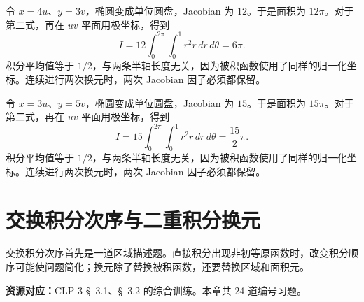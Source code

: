 \documentclass[UTF8,12pt,a4paper,fontset=fandol]{ctexart}
\begin{document}
\begin{solve}\label{ans:c36q24}
令 $x=4u$、$y=3v$，椭圆变成单位圆盘，Jacobian 为 $12$。于是面积为 $12\pi$。对于第二式，再在 $uv$ 平面用极坐标，得到
\[
I=12\int_0^{2\pi}\int_0^1r^2r\,dr\,d\theta=6\pi.
\]
积分平均值等于 $1/2$，与两条半轴长度无关，因为被积函数使用了同样的归一化坐标。连续进行两次换元时，两次 Jacobian 因子必须都保留。
\end{solve}

\begin{solve}\label{ans:c36q25}
令 $x=3u$、$y=5v$，椭圆变成单位圆盘，Jacobian 为 $15$。于是面积为 $15\pi$。对于第二式，再在 $uv$ 平面用极坐标，得到
\[
I=15\int_0^{2\pi}\int_0^1r^2r\,dr\,d\theta=\frac{15}{2}\pi.
\]
积分平均值等于 $1/2$，与两条半轴长度无关，因为被积函数使用了同样的归一化坐标。连续进行两次换元时，两次 Jacobian 因子必须都保留。
\end{solve}

\clearpage
\section{交换积分次序与二重积分换元}\label{sec:ch37}
交换积分次序首先是一道区域描述题。直接积分出现非初等原函数时，改变积分顺序可能使问题简化；换元除了替换被积函数，还要替换区域和面积元。

\textbf{资源对应：}CLP-3 \S~3.1、\S~3.2 的综合训练。本章共 24 道编号习题。
\end{document}
